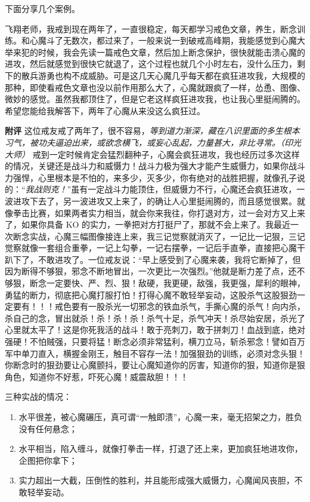 下面分享几个案例。

\begin{case}
    飞翔老师，我戒到现在两年了，一直很稳定，每天都学习戒色文章，养生，断念训练。和心魔斗了无数次，都过来了，一般来说一到破戒高峰期，我能感觉到心魔大举来犯的时候，我会先读一篇戒色文章，然后加上断念保护，很快就能击溃心魔的进攻，然后就感觉到很快它就退了，这个过程也就几个小时左右，没什么压力，剩下的散兵游勇也构不成威胁。可是这几天心魔几乎每天都在疯狂进攻我，大规模的那种，即使看戒色文章也没以前作用那么大了，心魔就跟疯了一样，怂恿、图像、微妙的感觉。虽然我都顶住了，但是它老这样疯狂进攻我，也让我心里挺闹腾的。希望您能给我解答下，两年了心魔从来没这么疯狂过。

    \textbf{附评} 这位戒友戒了两年了，很不容易，\textit{等到道力渐深，藏在八识里面的多生根本习气，被功夫逼迫出来，或欲念横飞，或妄心乱起，力量甚大，非比寻常。（印光大师）} 戒到一定时候肯定会猛烈翻种子，心魔会疯狂进攻，我也经历过多次这样的情况，关键还是战斗力和威慑力！战斗力极为强大才能产生威慑力，如果你战斗力强悍，心里根本是不怕的，来多少，灭多少，你有绝对的战胜把握，就像孔子说的：“\textit{我战则克！}”虽有一定战斗力能顶住，但威慑力不行，心魔还会疯狂进攻，一波进攻下去了，另一波进攻又上来了，的确让人心里挺闹腾的，而且感觉很累。就像拳击比赛，如果两者实力相当，就会你来我往，你打退对方，过一会对方又上来了，如果你具备 KO 的实力，一拳把对方打挺尸了，那就不会上来了。我最近一次断念实战，心魔三幅图像接连上来，我三记觉察就消灭了，一记比一记狠，三记觉察就像一套组合重拳，一记上勾拳，一记右摆拳，一记后手直拳，直接把心魔干趴下了，不敢进攻了。一位戒友说：“早上感受到了心魔来袭，我将它断掉了，但因为断得不够狠，邪念不断地冒出，一次更比一次强烈。”他就是断力差了点，还不够狠，断念一定要快、严、烈、狠！敌硬，我更硬，敌强，我更强，犀利的眼神，勇猛的断力，彻底把心魔打服打怕！打得心魔不敢轻举妄动，这股杀气这股狠劲一定要有！！！戒色要有一股杀光一切邪念的铁血杀气，手撕心魔的杀气！向内杀，杀自己的念，冒出就杀！杀！杀！杀！杀气十足，杀气冲天！杀尽始安居，杀光了心里就太平了！这是你死我活的战斗！敢于亮刺刀，敢于拼刺刀！血战到底，绝对强硬！不怕贼强，只要将猛！断念必须非常猛利，横刀立马，斩杀邪念！譬如百万军中单刀直入，横握金刚王，触目不容存一法！加强狠劲的训练，必须对念头狠！你断念时的狠劲要让心魔颤抖，要让心魔知道你的厉害，知道你的狠，知道你是狠角色，知道你不好惹，吓死心魔！威震敌胆！！！

    三种实战的情况：

    \begin{enumerate}
        \item 水平很差，被心魔碾压，真可谓“一触即溃”，心魔一来，毫无招架之力，胜负没有任何悬念；
        \item 水平相当，陷入缠斗，就像打拳击一样，打退了还上来，更加疯狂地进攻你，企图把你拿下；
        \item 实力超出一大截，压倒性的胜利，并且能形成强大威慑力，心魔闻风丧胆，不敢轻举妄动。
    \end{enumerate}


\end{case}
